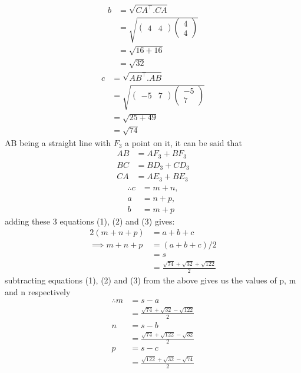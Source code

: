\documentclass[journal,12pt,twocolumn]{IEEEtran}
\theoremstyle{remark}
\begin{document}
\begin{align}
    b &= \sqrt{CA^{\top}.CA}\\
    &= \sqrt{\begin{pmatrix} 4&4 \end{pmatrix} \begin{pmatrix} 4\\4 \end{pmatrix}}\\
    &= \sqrt{16+16}\\
    &=\sqrt{32}
\end{align}
\begin{align}
    c &= \sqrt{AB^{\top}.AB}\\
    &= \sqrt{\begin{pmatrix} -5&7 \end{pmatrix} \begin{pmatrix} -5\\7 \end{pmatrix}}\\
    &= \sqrt{25+49}\\
    &=\sqrt{74}
\end{align}
AB being a straight line with $F_3$ a point on it, it can be said that
\begin{align}
    AB &= AF_3 + BF_3\\
    BC &= BD_3 + CD_3\\
    CA &= AE_3 + BE_3
\end{align}
\begin{align}
    \therefore 
    c &= m+n,\\
    a &= n+p, \\
    b &= m+p
\end{align}
adding these 3 equations (1), (2) and (3) gives:
\begin{align}
    2(m+n+p) &= a + b + c\\
    \implies m+n+p &= (a+b+c)/2 \\&= s \\&= \frac{\sqrt{74}+\sqrt{32}+\sqrt{122}}{2}
\end{align}
subtracting equations (1), (2) and (3) from the above gives us the values of p, m and n respectively
\begin{align}
    \therefore m &= s-a\\
    &= \frac{\sqrt{74}+\sqrt{32}-\sqrt{122}}{2}\\
    n &= s-b\\
    &= \frac{\sqrt{74}+\sqrt{122}-\sqrt{32}}{2}\\
    p &= s-c\\
    &=\frac{\sqrt{122}+\sqrt{32}-\sqrt{74}}{2}
\end{align}
\end{document}
